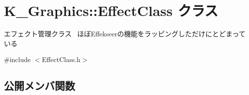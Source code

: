 \hypertarget{class_k___graphics_1_1_effect_class}{}\section{K\+\_\+\+Graphics\+:\+:Effect\+Class クラス}
\label{class_k___graphics_1_1_effect_class}


エフェクト管理クラス~\newline
ほぼ\+Effekseerの機能をラッピングしただけにとどまっている  




{\ttfamily \#include $<$Effect\+Class.\+h$>$}

\subsection*{公開メンバ関数}
